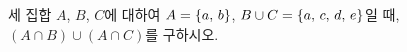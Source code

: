 세 집합 $A$, $B$, $C$에 대하여 $A=\{a,\mkern3mu b\}$, $B\cup C=\{a,\mkern3mu c,\mkern3mu d,\mkern3mu e\}$일 때, $(A\cap B)\cup(A\cap C)$를 구하시오.

